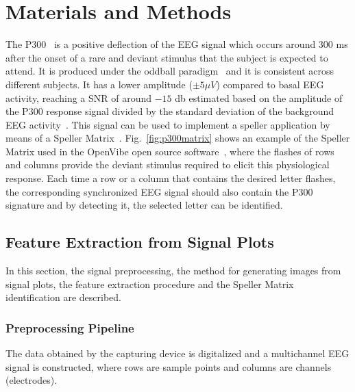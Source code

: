 \documentclass[utf8]{frontiersSCNS} %
\begin{document}
\section{Materials and Methods}

The P300~\citep{Farwell1988,Knuth2006} is a positive deflection of the EEG signal which occurs around $300$ ms after the onset of a rare and deviant stimulus that the subject is expected to attend.  It is produced under the oddball paradigm~\citep{WolpawJonathanR2012} and it is consistent across different subjects. It has a lower amplitude  ($\pm 5 \mu V $) compared to basal EEG activity, reaching a SNR of around $-15$ db estimated based on the amplitude of the P300 response signal divided by the standard deviation of the background EEG activity~\citep{Hu2010}.  This signal can be used to implement a speller application by means of a Speller Matrix~\citep{Farwell1988}. Fig.~\ref{fig:p300matrix} shows an example of the Speller Matrix used in the OpenVibe open source software~\citep{Renard2010}, where the flashes of rows and columns provide the deviant stimulus required to elicit this physiological response.   Each time a row or a column that contains the desired letter flashes, the corresponding synchronized EEG signal should also contain the P300 signature and by detecting it, the selected letter can be identified.

\subsection{Feature Extraction from Signal Plots} \label{Feature}

In this section, the signal preprocessing, the method for generating images from signal plots, the feature extraction procedure and the Speller Matrix identification are described. 

\subsubsection{Preprocessing Pipeline} \label{Pipeline}

The data obtained by the capturing device is digitalized and a multichannel EEG signal is constructed, where rows are sample points and columns are channels (electrodes).
\end{document}
